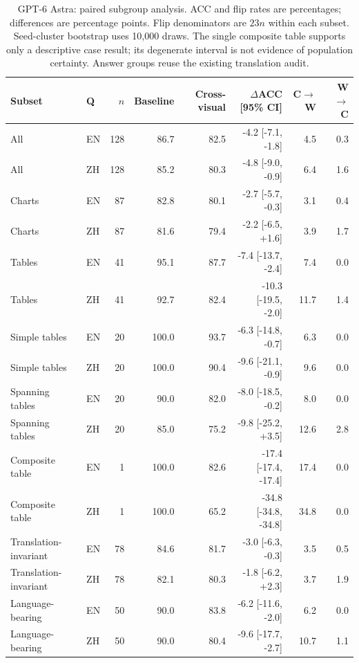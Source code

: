 \begin{table}[t]
\centering\scriptsize
\begin{tabular*}{\textwidth}{@{\extracolsep{\fill}}llrrrrrr@{}}
\toprule
Subset & Q & $n$ & Baseline & Cross-visual & $\Delta$ACC [95\% CI] & C$\to$W & W$\to$C \\
\midrule
All & EN & 128 & 86.7 & 82.5 & -4.2 [-7.1, -1.8] & 4.5 & 0.3 \\
All & ZH & 128 & 85.2 & 80.3 & -4.8 [-9.0, -0.9] & 6.4 & 1.6 \\
Charts & EN & 87 & 82.8 & 80.1 & -2.7 [-5.7, -0.3] & 3.1 & 0.4 \\
Charts & ZH & 87 & 81.6 & 79.4 & -2.2 [-6.5, +1.6] & 3.9 & 1.7 \\
Tables & EN & 41 & 95.1 & 87.7 & -7.4 [-13.7, -2.4] & 7.4 & 0.0 \\
Tables & ZH & 41 & 92.7 & 82.4 & -10.3 [-19.5, -2.0] & 11.7 & 1.4 \\
Simple tables & EN & 20 & 100.0 & 93.7 & -6.3 [-14.8, -0.7] & 6.3 & 0.0 \\
Simple tables & ZH & 20 & 100.0 & 90.4 & -9.6 [-21.1, -0.9] & 9.6 & 0.0 \\
Spanning tables & EN & 20 & 90.0 & 82.0 & -8.0 [-18.5, -0.2] & 8.0 & 0.0 \\
Spanning tables & ZH & 20 & 85.0 & 75.2 & -9.8 [-25.2, +3.5] & 12.6 & 2.8 \\
Composite table & EN & 1 & 100.0 & 82.6 & -17.4 [-17.4, -17.4] & 17.4 & 0.0 \\
Composite table & ZH & 1 & 100.0 & 65.2 & -34.8 [-34.8, -34.8] & 34.8 & 0.0 \\
Translation-invariant & EN & 78 & 84.6 & 81.7 & -3.0 [-6.3, -0.3] & 3.5 & 0.5 \\
Translation-invariant & ZH & 78 & 82.1 & 80.3 & -1.8 [-6.2, +2.3] & 3.7 & 1.9 \\
Language-bearing & EN & 50 & 90.0 & 83.8 & -6.2 [-11.6, -2.0] & 6.2 & 0.0 \\
Language-bearing & ZH & 50 & 90.0 & 80.4 & -9.6 [-17.7, -2.7] & 10.7 & 1.1 \\
\bottomrule\end{tabular*}
\caption{GPT-6 Astra: paired subgroup analysis. ACC and flip rates are percentages; differences are percentage points. Flip denominators are $23n$ within each subset. Seed-cluster bootstrap uses 10,000 draws. The single composite table supports only a descriptive case result; its degenerate interval is not evidence of population certainty. Answer groups reuse the existing translation audit.}
\end{table}

